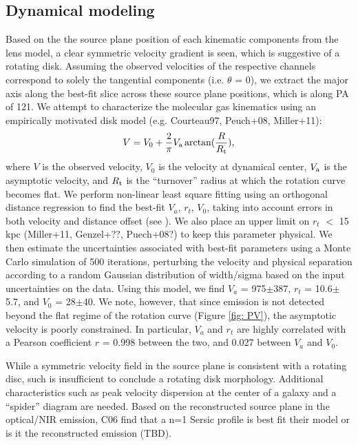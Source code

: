 \documentclass[]{emulateapj}
\begin{document}
\subsection{\bco Dynamical modeling} \label{sec:dynamics}
Based on the the source plane position of each kinematic components from the
lens model, a clear symmetric velocity gradient is seen, which is suggestive
of a rotating disk.
Assuming the observed velocities of the respective channels
correspond to solely the tangential components (i.e. $\theta$ = 0), we extract
the major axis along the best-fit slice across these source plane positions,
which is along PA of 121\degr.
We attempt to characterize the molecular gas kinematics using an empirically motivated disk model (e.g. Courteau97, Peuch+08, Miller+11):
\begin{equation}
V = V_0 + \frac{2}{\pi} V_{\rm a} \arctan(\frac{R}{R_{\rm t}}),
\end{equation}
where $V$ is the observed velocity, $V_0$ is the velocity at dynamical center, $V_{\rm a}$ is the asymptotic velocity, and $R_{\rm t}$ is the ``turnover'' radius at which the rotation curve
becomes flat. We perform non-linear least square fitting using an orthogonal distance regression to find the best-fit $V_a$, $r_t$, $V_0$, taking into account
errors in both velocity and distance offset (see ). We also place an upper limit on $r_t$ $<$ 15 kpc (Miller+11, Genzel+??, Puech+08?) to keep this
parameter physical. We then estimate the uncertainties associated with best-fit parameters using a Monte Carlo simulation of 500 iterations, perturbing
the velocity and physical separation according to a random Gaussian distribution of width/sigma based on the input uncertainties on
the data. Using this model, we find $V_a$ = 975$\pm$387, $r_t$ = 10.6$\pm$5.7,
and $V_0$ = 28$\pm$40. We note, however, that since emission is not detected beyond the flat regime of the rotation curve (Figure \ref{fig: PV}), the asymptotic velocity is
poorly constrained. In particular, $V_a$ and $r_t$ are highly correlated with a Pearson coefficient $r$ = 0.998 between the two, and 0.027 between $V_a$ and $V_0$.

While a symmetric velocity field in the source plane is consistent with a rotating disc, such is insufficient to conclude a rotating disk morphology. Additional characteristics such
as peak velocity dispersion at the center of a galaxy and a ``spider'' diagram are needed. Based on the reconstructed source plane in the optical/NIR emission, C06 find that a
n=1 Sersic profile is best fit their model or is it the reconstructed emission (TBD).
\end{document}
